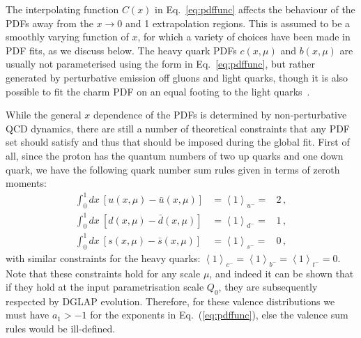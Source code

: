 The interpolating function $C(x)$ in
Eq.~\eqref{eq:pdffunc}
affects the behaviour of the PDFs away from the $x\to 0$ and 1
extrapolation regions.
%
This is assumed to be a smoothly varying function of $x$, for which a variety of choices have been made in PDF fits, as we discuss below.
%
The heavy quark PDFs $c(x,\mu)$ and $b(x,\mu)$ are usually not
parameterised using the form in  Eq.~\eqref{eq:pdffunc}, but rather
generated by perturbative emission off gluons and light quarks,
though it is also possible to fit the charm PDF on an equal footing
to the light quarks~\cite{Ball:2016neh}.

While the general $x$ dependence of the PDFs is determined by
non-perturbative QCD dynamics, there are still a number
of theoretical constraints that any PDF set should satisfy and thus that
should be imposed during the global fit.
%
First of all, since
the proton has the quantum numbers of two up quarks and one down quark,
we have the following quark number sum rules given in terms of zeroth
moments: 
%
\begin{eqnarray}
\int_{0}^{1}dx\ \left[u(x,\mu)-\bar{u}(x,\mu)\right] & =\left\langle 1\right\rangle _{u^{-}}= & 2 \, ,\nonumber \\
\int_{0}^{1}dx\ \left[d(x,\mu)-\bar{d}(x,\mu)\right] & =\left\langle 1\right\rangle _{d^{-}}= & 1 \, ,
\label{eq:valencesumrules}\\
\int_{0}^{1}dx\ \left[s(x,\mu)-\bar{s}(x,\mu)\right] & =\left\langle 1\right\rangle _{s^{-}}= & 0 \, ,\nonumber
\end{eqnarray}
with similar constraints for the heavy quarks: $\left\langle 1\right\rangle _{c^{-}}=\left\langle 1\right\rangle _{b^{-}}=\left\langle 1\right\rangle _{t^{-}}=0$.
%
Note that these constraints hold for any scale $\mu$, and indeed it can be shown
that if they hold at the input parametrisation scale $Q_0$, they
are subsequently respected by DGLAP evolution.
%
Therefore, for these valence distributions we must have $a_1>-1$ for the exponents in
Eq.~(\ref{eq:pdffunc}), else the valence sum rules would be ill-defined.

